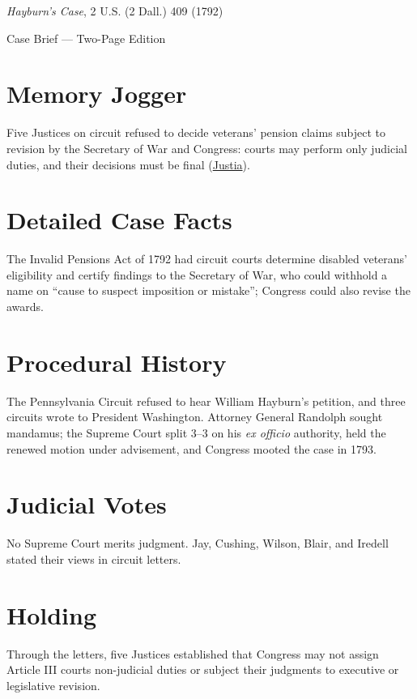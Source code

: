 \documentclass[12pt]{article}
\begin{document}
\begin{center}
{\LARGE \textit{Hayburn's Case}, 2 U.S. (2 Dall.) 409 (1792)\par}
\vspace{0.5em}
{\large Case Brief --- Two-Page Edition\par}
\end{center}

\section{Memory Jogger}
Five Justices on circuit refused to decide veterans' pension claims subject to revision by the Secretary of War and Congress: courts may perform only judicial duties, and their decisions must be final (\href{https://supreme.justia.com/cases/federal/us/2/409/}{Justia}).

\section{Detailed Case Facts}
The Invalid Pensions Act of 1792 had circuit courts determine disabled veterans' eligibility and certify findings to the Secretary of War, who could withhold a name on ``cause to suspect imposition or mistake''; Congress could also revise the awards.

\section{Procedural History}
The Pennsylvania Circuit refused to hear William Hayburn's petition, and three circuits wrote to President Washington. Attorney General Randolph sought mandamus; the Supreme Court split 3--3 on his \textit{ex officio} authority, held the renewed motion under advisement, and Congress mooted the case in 1793.

\section{Judicial Votes}
No Supreme Court merits judgment. Jay, Cushing, Wilson, Blair, and Iredell stated their views in circuit letters.

\section{Holding}
Through the letters, five Justices established that Congress may not assign Article III courts non-judicial duties or subject their judgments to executive or legislative revision.
\end{document}
